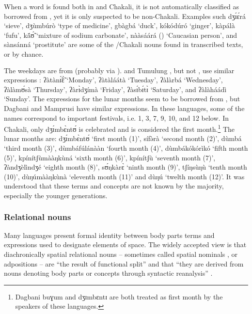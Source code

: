 \begin{exe}
\begin{exe}
\begin{exe}
\begin{exe}
\begin{exe}
\begin{exe}
\begin{exe}
\begin{exe}
\newpage 
When a word is found both in  and Chakali, it is not automatically classified as borrowed from , yet it is only suspected to be non-Chakali.  Examples such {\sls dʒɪ́ɛ́rá} `sieve', {\sls dʒùmbúrò} `type of medicine', {\sls gbàgbá} `duck', {\sls kókódúró}  `ginger', {\sls kàpálà} `fufu', {\sls kã́ʊ̃́}  `mixture of sodium carbonate', {\sls nààsáárá}  () `Caucasian person', and  {\sls sànsánná} `prostitute' are some of the /Chakali nouns found in transcribed texts, or by chance. 

The weekdays are from  (probably via ).  and Tumulung ,  but  not , use similar expressions \citep[60]{nade96}: {\sls ʔàtànɪ̃́ɛ̃̀} `Monday', {\sls ʔàtàláátà} `Tuesday', {\sls ʔàlàrbá} `Wednesday',   {\sls ʔàlàmʊ́sà} `Thursday',  {\sls ʔàrɪ̀dʒímà} `Friday', {\sls ʔàsɪ́bɪ́tɪ̀} `Saturday', and {\sls ʔàlàháádì} `Sunday'.  The expressions for the lunar months seem to be borrowed from , but Dagbani and Mamprusi have similar expressions. In these  languages, some of the names  correspond to important festivals, i.e. 1, 3, 7, 9, 10, and 12 below. In Chakali, only {\sls dʒɪ́mbɛ̀ntʊ́} is celebrated and  is considered the first month.\footnote{Dagbani {\sls buɣum} and  {\sls  dʒɪmbɛntɪ} are both treated as first month by the speakers of these languages.} The lunar months are: {\sls dʒɪ́mbɛ̀ntʊ́} `first month (1)', {\sls sífə̀rà}  `second month (2)', {\sls dùmbá} `third month (3)', {\sls dùmbáfúlánààn} `fourth month (4)',  {\sls dùmbákókórìkó} `fifth month (5)', {\sls kpínítʃùmààŋkùná} `sixth month (6)', {\sls kpínítʃù} `seventh month (7)', {\sls ʔàndʒèlìndʒé} `eighth month (8)', {\sls sʊ́ŋkàrɛ̀} `ninth month (9)', {\sls tʃíŋsùŋù} `tenth month (10)', {\sls dùŋúmààŋkùnà} `eleventh month (11)' and {\sls dùŋú} `twelth month (12)'.  It was understood that these terms and concepts are not known by the majority, especially the younger generations.


\subsubsection{Relational nouns}
\label{sec:SPA-relnoun}


Many  languages present formal identity between body parts terms and expressions used to designate elements of space. The widely accepted view is that diachronically  spatial relational nouns  -- sometimes called spatial nominals \citep[895]{Hell07},  or adpositions  \citep[137]{Hein97} --  are ``the result of functional split'' and that ``they are derived from nouns denoting body parts or  concepts through syntactic reanalysis'' \citep[256]{Hein84}.




\end{exe}
\end{exe}
\end{exe}
\end{exe}
\end{exe}
\end{exe}
\end{exe}
\end{exe}
